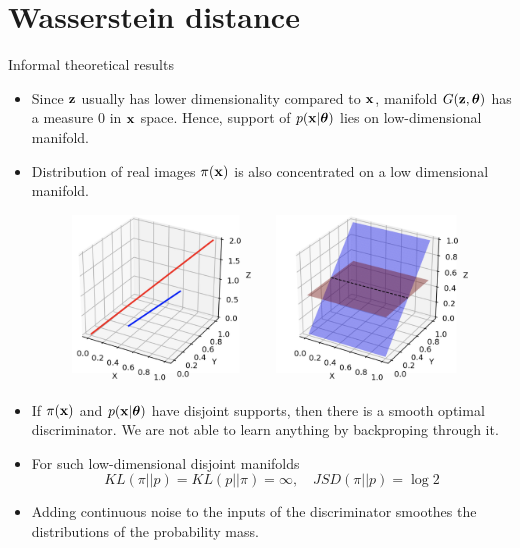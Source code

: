 \section{Wasserstein distance}
\begin{frame}{Informal theoretical results}
	\vspace{-0.3cm}
	\begin{itemize}
		\footnotesize
		\item Since $\mathbf{z}$ usually has lower dimensionality compared to $\mathbf{x}$, manifold $G(\mathbf{z}, \boldsymbol{\theta})$ has a measure 0 in $\mathbf{x}$ space. Hence, support of $p(\mathbf{x} | \boldsymbol{\theta})$ lies on low-dimensional manifold.
		\item Distribution of real images $\pi(\mathbf{x})$ is also concentrated on a low dimensional manifold.
		\begin{figure}
			\centering
			\includegraphics[width=0.5\linewidth]{figs/low_dim_manifold}
		\end{figure}
		\item If $\pi(\mathbf{x})$ and $p(\mathbf{x} | \boldsymbol{\theta})$ have disjoint supports, then there is a smooth optimal discriminator. We are not able to learn anything by backproping through it.
		\item For such low-dimensional disjoint manifolds
		\vspace{-0.2cm}
		\[
			KL(\pi || p) = KL(p || \pi) = \infty, \quad JSD(\pi || p) = \log 2
		\]
		\vspace{-0.7cm}
		\item Adding continuous noise to the inputs of the discriminator smoothes the distributions of the probability mass.
	\end{itemize}
\end{frame}
